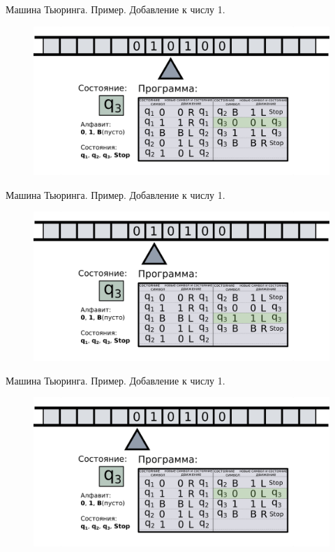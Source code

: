 \documentclass[10pt]{beamer}
\begin{document}
\begin{frame}{Машина Тьюринга. Пример. Добавление к числу 1.}
	\begin{figure}
		\centerline{\includegraphics[width=1.5\linewidth]{images/tm_ex_12.png}}
	\end{figure}
\end{frame}


\begin{frame}{Машина Тьюринга. Пример. Добавление к числу 1.}
	\begin{figure}
		\centerline{\includegraphics[width=1.5\linewidth]{images/tm_ex_13.png}}
	\end{figure}
\end{frame}


\begin{frame}{Машина Тьюринга. Пример. Добавление к числу 1.}
	\begin{figure}
		\centerline{\includegraphics[width=1.5\linewidth]{images/tm_ex_14.png}}
	\end{figure}
\end{frame}
\end{document}
